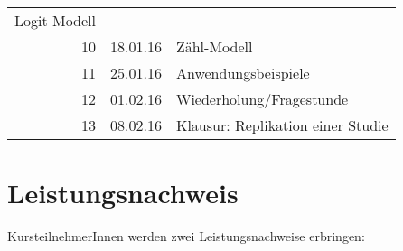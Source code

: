 \documentclass[]{article}
\renewcommand{\[}{\begin{equation}}
\renewcommand{\]}{\end{equation}}
\begin{document}
\begin{longtable}[c]{@{}rll@{}}
\begin{minipage}[t]{0.42\columnwidth}
Logit-Modell
\strut\end{minipage}\tabularnewline
\begin{minipage}[t]{0.18\columnwidth}\raggedleft\strut
10
\strut\end{minipage} &
\begin{minipage}[t]{0.18\columnwidth}\raggedright\strut
18.01.16
\strut\end{minipage} &
\begin{minipage}[t]{0.42\columnwidth}\raggedright\strut
Zähl-Modell
\strut\end{minipage}\tabularnewline
\begin{minipage}[t]{0.18\columnwidth}\raggedleft\strut
11
\strut\end{minipage} &
\begin{minipage}[t]{0.18\columnwidth}\raggedright\strut
25.01.16
\strut\end{minipage} &
\begin{minipage}[t]{0.42\columnwidth}\raggedright\strut
Anwendungsbeispiele
\strut\end{minipage}\tabularnewline
\begin{minipage}[t]{0.18\columnwidth}\raggedleft\strut
12
\strut\end{minipage} &
\begin{minipage}[t]{0.18\columnwidth}\raggedright\strut
01.02.16
\strut\end{minipage} &
\begin{minipage}[t]{0.42\columnwidth}\raggedright\strut
Wiederholung/Fragestunde
\strut\end{minipage}\tabularnewline
\begin{minipage}[t]{0.18\columnwidth}\raggedleft\strut
13
\strut\end{minipage} &
\begin{minipage}[t]{0.18\columnwidth}\raggedright\strut
08.02.16
\strut\end{minipage} &
\begin{minipage}[t]{0.42\columnwidth}\raggedright\strut
Klausur: Replikation einer Studie
\strut\end{minipage}\tabularnewline
\bottomrule
\end{longtable}

\section{Leistungsnachweis}\label{leistungsnachweis}

KursteilnehmerInnen werden zwei Leistungsnachweise erbringen:
\end{document}
